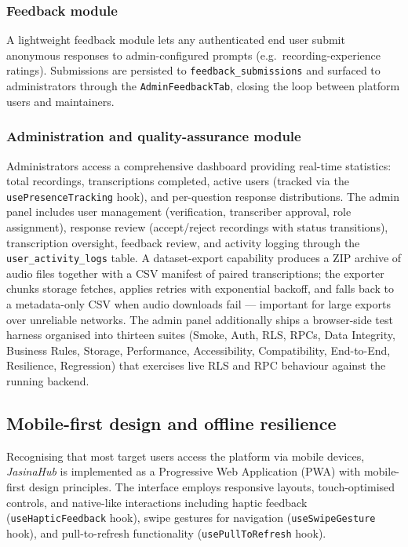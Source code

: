 \documentclass[final,5p,times,twocolumn]{elsarticle}
\begin{document}
\subsubsection{Feedback module}
A lightweight feedback module lets any authenticated end user submit anonymous responses to admin-configured prompts (e.g.\ recording-experience ratings). Submissions are persisted to \texttt{feedback\_submissions} and surfaced to administrators through the \texttt{AdminFeedbackTab}, closing the loop between platform users and maintainers.

\subsubsection{Administration and quality-assurance module}
Administrators access a comprehensive dashboard providing real-time statistics: total recordings, transcriptions completed, active users (tracked via the \texttt{usePresenceTracking} hook), and per-question response distributions. The admin panel includes user management (verification, transcriber approval, role assignment), response review (accept/reject recordings with status transitions), transcription oversight, feedback review, and activity logging through the \texttt{user\_activity\_logs} table. A dataset-export capability produces a ZIP archive of audio files together with a CSV manifest of paired transcriptions; the exporter chunks storage fetches, applies retries with exponential backoff, and falls back to a metadata-only CSV when audio downloads fail --- important for large exports over unreliable networks. The admin panel additionally ships a browser-side test harness organised into thirteen suites (Smoke, Auth, RLS, RPCs, Data Integrity, Business Rules, Storage, Performance, Accessibility, Compatibility, End-to-End, Resilience, Regression) that exercises live RLS and RPC behaviour against the running backend.

\subsection{Mobile-first design and offline resilience}
Recognising that most target users access the platform via mobile devices, \emph{JasinaHub} is implemented as a Progressive Web Application (PWA) with mobile-first design principles. The interface employs responsive layouts, touch-optimised controls, and native-like interactions including haptic feedback (\texttt{useHapticFeedback} hook), swipe gestures for navigation (\texttt{useSwipeGesture} hook), and pull-to-refresh functionality (\texttt{usePullToRefresh} hook).
\end{document}
